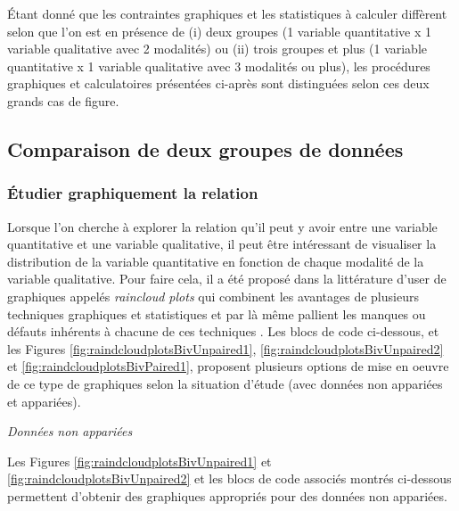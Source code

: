 \documentclass[
  french,
]{book}
\newenvironment{Shaded}{\begin{snugshade}}{\end{snugshade}}
\newcommand{\CommentTok}[1]{\textcolor[rgb]{0.56,0.35,0.01}{\textit{#1}}}
\newcommand{\KeywordTok}[1]{\textcolor[rgb]{0.13,0.29,0.53}{\textbf{#1}}}
\newcommand{\NormalTok}[1]{#1}
\newcommand{\OperatorTok}[1]{\textcolor[rgb]{0.81,0.36,0.00}{\textbf{#1}}}
\newcommand{\StringTok}[1]{\textcolor[rgb]{0.31,0.60,0.02}{#1}}
\begin{document}
Étant donné que les contraintes graphiques et les statistiques à calculer diffèrent selon que l'on est en présence de (i) deux groupes (1 variable quantitative x 1 variable qualitative avec 2 modalités) ou (ii) trois groupes et plus (1 variable quantitative x 1 variable qualitative avec 3 modalités ou plus), les procédures graphiques et calculatoires présentées ci-après sont distinguées selon ces deux grands cas de figure.

\hypertarget{comparaison-de-deux-groupes-de-donnuxe9es}{%
\subsection{Comparaison de deux groupes de données}\label{comparaison-de-deux-groupes-de-donnuxe9es}}

\hypertarget{uxe9tudier-graphiquement-la-relation-2}{%
\subsubsection{Étudier graphiquement la relation}\label{uxe9tudier-graphiquement-la-relation-2}}

Lorsque l'on cherche à explorer la relation qu'il peut y avoir entre une variable quantitative et une variable qualitative, il peut être intéressant de visualiser la distribution de la variable quantitative en fonction de chaque modalité de la variable qualitative. Pour faire cela, il a été proposé dans la littérature d'user de graphiques appelés \emph{raincloud plots} qui combinent les avantages de plusieurs techniques graphiques et statistiques et par là même pallient les manques ou défauts inhérents à chacune de ces techniques \autocite{allenRaincloudPlotsMultiplatform2019}. Les blocs de code ci-dessous, et les Figures \ref{fig:raindcloudplotsBivUnpaired1}, \ref{fig:raindcloudplotsBivUnpaired2} et \ref{fig:raindcloudplotsBivPaired1}, proposent plusieurs options de mise en oeuvre de ce type de graphiques selon la situation d'étude (avec données non appariées et appariées).

\emph{Données non appariées}

Les Figures \ref{fig:raindcloudplotsBivUnpaired1} et \ref{fig:raindcloudplotsBivUnpaired2} et les blocs de code associés montrés ci-dessous permettent d'obtenir des graphiques appropriés pour des données non appariées.

\begin{Shaded}
\end{Shaded}
\end{document}
